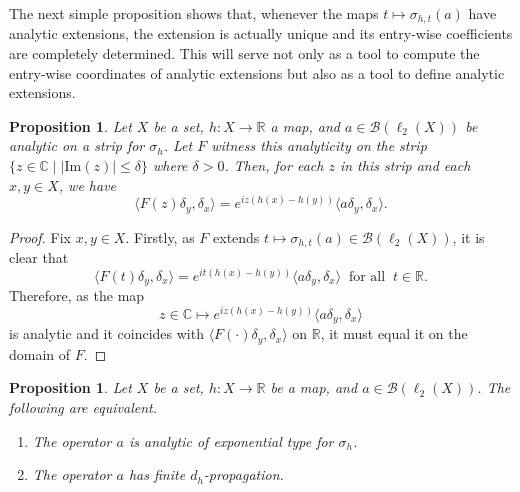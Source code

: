 \documentclass[11pt]{amsart}
\newcommand{\R}{\mathbb{R}}
\newcommand{\C}{\mathbb{C}}
\newcommand{\cB}{\mathcal{B}}
\numberwithin{equation}{section}
\newtheorem{proposition}[theorem]{Proposition}
\theoremstyle{definition}
\theoremstyle{remark}
\begin{document}
The next simple proposition   shows that, whenever the maps $t\mapsto \sigma_{h,t}(a)$ have analytic extensions,   the extension is actually unique and its entry-wise coefficients are completely determined. This will serve not only as a tool to compute the entry-wise coordinates of analytic extensions but also as a tool to define analytic extensions.


 \begin{proposition}\label{Prop.xy.coordinates.ana.extension}
     Let $X$ be a set, $h\colon X\to \R$ a map, and $a\in \cB(\ell_2(X))$ be analytic on a strip for $\sigma_h$. Let $F$ witness this analyticity on the strip  $\{z\in \C\mid |\mathrm{Im}(z)|\leq \delta\}$ where $\delta>0$. Then, for each $z$ in this strip and each $x,y\in X$, we have
     \[\langle F(z)\delta_y,\delta_x\rangle=e^{iz(h(x)-h(y))}\langle a\delta_y,\delta_x\rangle.\]
 \end{proposition}

 \begin{proof}
     Fix   $x,y\in X$. Firstly, as $F$ extends $t\mapsto \sigma_{h,t}(a)\in \cB(\ell_2(X))$, it is clear that
      \[\langle F(t)\delta_y,\delta_x\rangle=e^{it(h(x)-h(y))}\langle a\delta_y,\delta_x\rangle\ \text{ for all }\ t\in \R.\]
Therefore, as the map
     \[z\in \C\mapsto e^{iz(h(x)-h(y))}\langle a\delta_y,\delta_x\rangle\] is analytic and it coincides with $\langle F(\cdot)\delta_y,\delta_x\rangle$ on $\R$, it must equal it on the domain of $F$.
 \end{proof}


\begin{proposition}\label{Prop.analitic.iff.finite.dh.prop}
    Let $X$ be a set, $h\colon X\to \R$ be a map, and $a\in\cB(\ell_2(X))$. The following are equivalent.

\begin{enumerate}
    \item \label{Item.Prop.analitic.iff.finite.dh.prop.1} The operator $a$ is   analytic   of exponential type for  $\sigma_h$.
    \item\label{Item.Prop.analitic.iff.finite.dh.prop.3}  The operator $a$ has finite $d_h$-propagation.
\end{enumerate}
\end{proposition}
\end{document}
